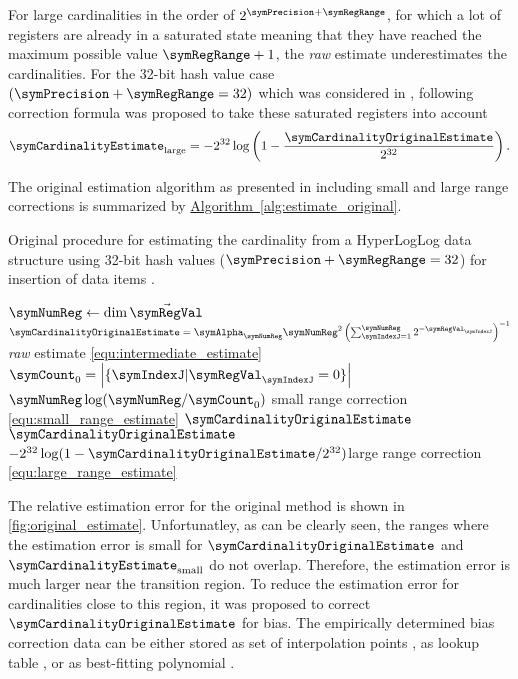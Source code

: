 \documentclass[11pt]{article} %
\newcommand*{\algoref}[1]{\hyperref[#1]{Algorithm~\ref*{#1}}}
\begin{document}
For large cardinalities in the order of $2^{\symPrecision+\symRegRange}$, for which a lot of registers are already in a saturated state meaning that they have reached the maximum possible value $\symRegRange + 1$, the \emph{raw} estimate underestimates the cardinalities. For the 32-bit hash value case $(\symPrecision+\symRegRange=32)$ which was considered in \cite{Flajolet2007}, following correction formula was proposed to take these saturated registers into account
\begin{equation}
\label{equ:large_range_estimate}
\symCardinalityEstimate_\text{large}
=
-2^{32}\log\left(1-\frac{\symCardinalityOriginalEstimate}{2^{32}}\right).
\end{equation}

The original estimation algorithm as presented in \cite{Flajolet2007} including small and large range corrections is summarized by \algoref{alg:estimate_original}. 
\begin{algorithm}
\caption{Original procedure for estimating the cardinality from a  HyperLogLog data structure using 32-bit hash values ($\symPrecision+\symRegRange = 32$) for insertion of data items \cite{Flajolet2007}.}
\label{alg:estimate_original}
\begin{algorithmic}
\State $\symNumReg \gets \dim \vec{\symRegVal}$
\State $\symCardinalityOriginalEstimate = \symAlpha_\symNumReg \symNumReg^2\left(\sum_{\symIndexJ=1}^\symNumReg 2^{-\symRegVal_\symIndexJ}\right)^{-1}$
\Comment \emph{raw} estimate \eqref{equ:intermediate_estimate}
\State $\symCount_0 = \left|\{\symIndexJ |\symRegVal_\symIndexJ=0\}\right|$
\State \Return $\symNumReg \log(\symNumReg / \symCount_0)$ \Comment small range correction \eqref{equ:small_range_estimate}
\Else
\State \Return $\symCardinalityOriginalEstimate$
\EndIf
{}
\State \Return $\symCardinalityOriginalEstimate$
\Else
\State\Return $-2^{32}\log(1-\symCardinalityOriginalEstimate/2^{32})$\Comment large range correction \eqref{equ:large_range_estimate}
\EndIf
\EndFunction
\end{algorithmic}
\end{algorithm}
The relative estimation error for the original method is shown in \autoref{fig:original_estimate}. Unfortunatley, as can be clearly seen, the ranges where the estimation error is small for $\symCardinalityOriginalEstimate$ and $\symCardinalityEstimate_\text{small}$ do not overlap. Therefore, the estimation error is much larger near the transition region. To reduce the estimation error for cardinalities close to this region, it was proposed to correct $\symCardinalityOriginalEstimate$ for bias. The empirically determined bias correction data can be either stored as set of interpolation points \cite{Heule2013}, as lookup table \cite{Rhodes2015}, or as best-fitting polynomial \cite{Sanfilippo2014}. 
\end{document}
